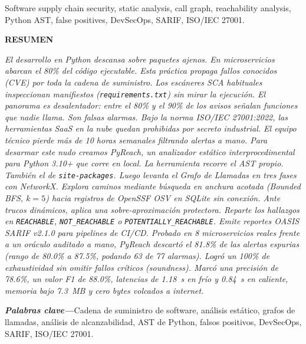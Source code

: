 \documentclass[conference]{IEEEtran}
\begin{document}
\begin{IEEEkeywords}
Software supply chain security, static analysis, call graph, reachability analysis, Python AST, false positives, DevSecOps, SARIF, ISO/IEC 27001.
\end{IEEEkeywords}

\vspace{0.15cm}
\begin{center}
{\bfseries\small RESUMEN}
\end{center}
\begin{small}
\textit{El desarrollo en Python descansa sobre paquetes ajenos. En microservicios abarcan el 80\% del código ejecutable. Esta práctica propaga fallos conocidos (CVE) por toda la cadena de suministro. Los escáneres SCA habituales inspeccionan manifiestos (\texttt{requirements.txt}) sin mirar la ejecución. El panorama es desalentador: entre el 80\% y el 90\% de los avisos señalan funciones que nadie llama. Son falsas alarmas. Bajo la norma ISO/IEC 27001:2022, las herramientas SaaS en la nube quedan prohibidas por secreto industrial. El equipo técnico pierde más de 10 horas semanales filtrando alertas a mano. Para desarmar este nudo creamos \textit{PyReach}, un analizador estático interprocedimental para Python 3.10+ que corre en local. La herramienta recorre el AST propio. También el de \texttt{site-packages}. Luego levanta el Grafo de Llamadas en tres fases con NetworkX. Explora caminos mediante búsqueda en anchura acotada (Bounded BFS, $k=5$) hacia registros de OpenSSF OSV en SQLite sin conexión. Ante trucos dinámicos, aplica una sobre-aproximación protectora. Reparte los hallazgos en \texttt{REACHABLE}, \texttt{NOT\_REACHABLE} o \texttt{POTENTIALLY\_REACHABLE}. Emite reportes OASIS SARIF v2.1.0 para pipelines de CI/CD. Probado en 8 microservicios reales frente a un oráculo auditado a mano, \textit{PyReach} descartó el 81.8\% de las alertas espurias (rango de 80.0\% a 87.5\%, podando 63 de 77 alarmas). Logró un 100\% de exhaustividad sin omitir fallos críticos (\textit{soundness}). Marcó una precisión de 78.6\%, un valor F1 de 88.0\%, latencias de 1.18~s en frío y 0.84~s en caliente, memoria bajo 7.3~MB y cero bytes volcados a internet.}
\end{small}

\vspace{0.1cm}
\noindent\textbf{\textit{Palabras clave---}}Cadena de suministro de software, análisis estático, grafos de llamadas, análisis de alcanzabilidad, AST de Python, falsos positivos, DevSecOps, SARIF, ISO/IEC 27001.
\end{document}
